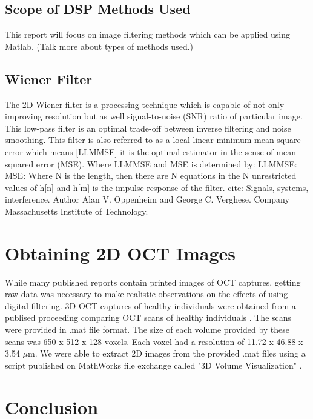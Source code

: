 \documentclass[%
reprint,
showpacs,preprintnumbers,
bibnotes,
amsmath,amssymb,
aps,
pra,
]{revtex4-1}
\begin{document}
	\subsection{\label{sec:level2} Scope of DSP Methods Used}
	This report will focus on image filtering methods which can be applied using Matlab.
	(Talk more about types of methods used.)
	\subsection{\label{sec:level2} Wiener Filter}
	The 2D Wiener filter is a processing technique which is capable of not only improving resolution but as well signal-to-noise (SNR) ratio of particular image. This low-pass filter is an optimal trade-off between inverse filtering and noise smoothing. This filter is also referred to as a local linear minimum mean square error which means [LLMMSE] it is the optimal estimator in the sense of mean squared error (MSE). Where LLMMSE and MSE is determined by:
LLMMSE:
MSE:
Where N is the length, then there are N equations in the N unrestricted values of h[n] and h[m] is the impulse response of the filter.
cite: Signals, systems, interference. Author Alan V. Oppenheim and George C. Verghese. Company Massachusetts Institute of Technology.

	\section{\label{sec:level1} Obtaining 2D OCT Images}
	While many published reports contain printed images of OCT captures, getting raw data was necessary to make realistic observations on the effects of using digital filtering. 3D OCT captures of healthy individuals were obtained from a publised proceeding comparing OCT scans of healthy individuals \cite{tahereh_2014}. The scans were provided in .mat file format. The size of each volume provided by these scans was 650 x 512 x 128 voxels. Each voxel had a resolution of 11.72 x 46.88 x 3.54 $\mu$m. We were able to extract 2D images from the provided .mat files using a script published on MathWorks file exchange called "3D Volume Visualization" \cite{stough}.


	\section{\label{sec:level1} Conclusion}





	
\end{document}
